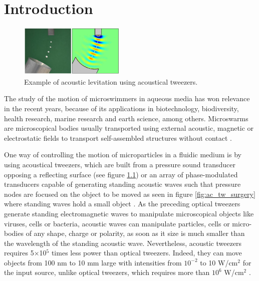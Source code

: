 \chapter{Introduction}
\begin{figure}[b]
    \centering
    \includegraphics[width=0.45\textwidth]{images/intro/ac_levitaion_1.jpg}
    \caption{Example of acoustic levitation using acoustical tweezers.}
    \label{fig:ac_lev}
\end{figure}
The study of the motion of microswimmers in aqueous media has won relevance in the recent years, because of its applications in biotechnology, biodiversity, health research, marine research and earth science, among others. Microswarms are microscopical bodies usually transported using external acoustic, magnetic or electrostatic fields to transport self-assembled structures without contact \cite{Mohanty2020,Harting2021,Shi2009}.

One way of controlling the motion of microparticles in a fluidic medium is by using acoustical tweezers, which are built from a pressure sound transducer opposing a reflecting surface (see figure \ref{fig:ac_lev}) or an array of phase-modulated transducers capable of generating standing acoustic waves such that pressure nodes are focused on the object to be moved as seen in figure \ref{fig:ac_tw_surgery} where standing waves hold a small object \cite{Shi2009, Marzo2015}. As the preceding optical tweezers generate standing electromagnetic waves to manipulate microscopical objects like viruses, cells or bacteria, acoustic waves can manipulate particles, cells or micro-bodies of any shape, charge or polarity, as soon as it size is much smaller than the wavelength of the standing acoustic wave. Nevertheless, acoustic tweezers requires 5$\times$10$^5$ times less power than optical tweezers. Indeed, they can move objects from 100 nm to 10 mm large with intensities from $10^{-2}$ to 10 W/cm$^2$ for the input source, unlike optical tweezers, which requires more than $10^{6}$ W/cm$^2$ \cite{Ozcelik2018}. 

